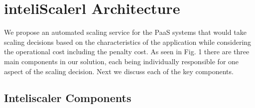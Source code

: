 \section{inteliScalerl Architecture}
We propose an automated scaling service for the PaaS systems that would take scaling decisions based on the characteristics of the application while considering the operational cost including the penalty cost. As seen in Fig. 1 there are three main components in our solution, each being individually responsible for one aspect of the scaling decision. Next we discuss each of the key components.\\

\subsection{Inteliscaler Components}